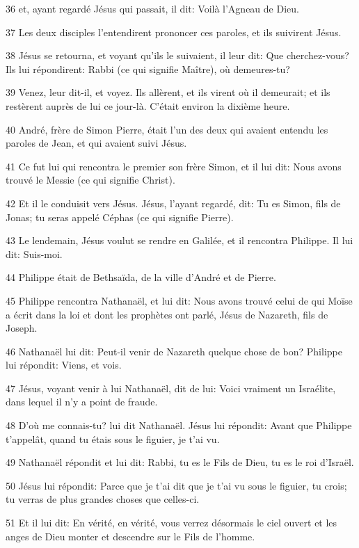\par 36 et, ayant regardé Jésus qui passait, il dit: Voilà l'Agneau de Dieu.
\par 37 Les deux disciples l'entendirent prononcer ces paroles, et ils suivirent Jésus.
\par 38 Jésus se retourna, et voyant qu'ils le suivaient, il leur dit: Que cherchez-vous? Ils lui répondirent: Rabbi (ce qui signifie Maître), où demeures-tu?
\par 39 Venez, leur dit-il, et voyez. Ils allèrent, et ils virent où il demeurait; et ils restèrent auprès de lui ce jour-là. C'était environ la dixième heure.
\par 40 André, frère de Simon Pierre, était l'un des deux qui avaient entendu les paroles de Jean, et qui avaient suivi Jésus.
\par 41 Ce fut lui qui rencontra le premier son frère Simon, et il lui dit: Nous avons trouvé le Messie (ce qui signifie Christ).
\par 42 Et il le conduisit vers Jésus. Jésus, l'ayant regardé, dit: Tu es Simon, fils de Jonas; tu seras appelé Céphas (ce qui signifie Pierre).
\par 43 Le lendemain, Jésus voulut se rendre en Galilée, et il rencontra Philippe. Il lui dit: Suis-moi.
\par 44 Philippe était de Bethsaïda, de la ville d'André et de Pierre.
\par 45 Philippe rencontra Nathanaël, et lui dit: Nous avons trouvé celui de qui Moïse a écrit dans la loi et dont les prophètes ont parlé, Jésus de Nazareth, fils de Joseph.
\par 46 Nathanaël lui dit: Peut-il venir de Nazareth quelque chose de bon? Philippe lui répondit: Viens, et vois.
\par 47 Jésus, voyant venir à lui Nathanaël, dit de lui: Voici vraiment un Israélite, dans lequel il n'y a point de fraude.
\par 48 D'où me connais-tu? lui dit Nathanaël. Jésus lui répondit: Avant que Philippe t'appelât, quand tu étais sous le figuier, je t'ai vu.
\par 49 Nathanaël répondit et lui dit: Rabbi, tu es le Fils de Dieu, tu es le roi d'Israël.
\par 50 Jésus lui répondit: Parce que je t'ai dit que je t'ai vu sous le figuier, tu crois; tu verras de plus grandes choses que celles-ci.
\par 51 Et il lui dit: En vérité, en vérité, vous verrez désormais le ciel ouvert et les anges de Dieu monter et descendre sur le Fils de l'homme.

